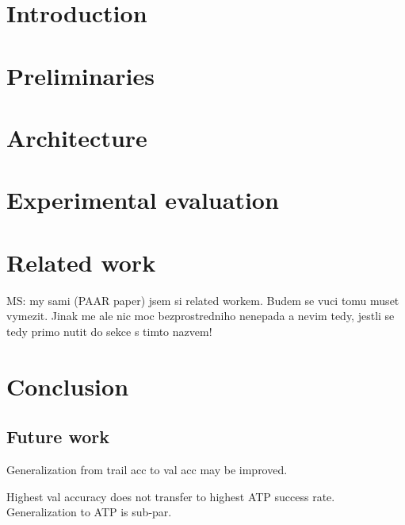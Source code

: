 \documentclass[runningheads]{llncs}
\begin{document}
\maketitle

\begin{abstract}

\end{abstract}

\section{Introduction}



\section{Preliminaries}



\section{Architecture}
\label{sec:architecture}



\section{Experimental evaluation}
\label{sec:evaluation}



\section{Related work}

MS: my sami (PAAR paper) jsem si related workem. Budem se vuci tomu muset vymezit.
Jinak me ale nic moc bezprostredniho nenepada a nevim tedy, jestli se tedy primo
nutit do sekce s timto nazvem!

\section{Conclusion}

\subsection{Future work}

Generalization from trail acc to val acc may be improved.

Highest val accuracy does not transfer to highest ATP success rate. Generalization to ATP is sub-par.
\end{document}
